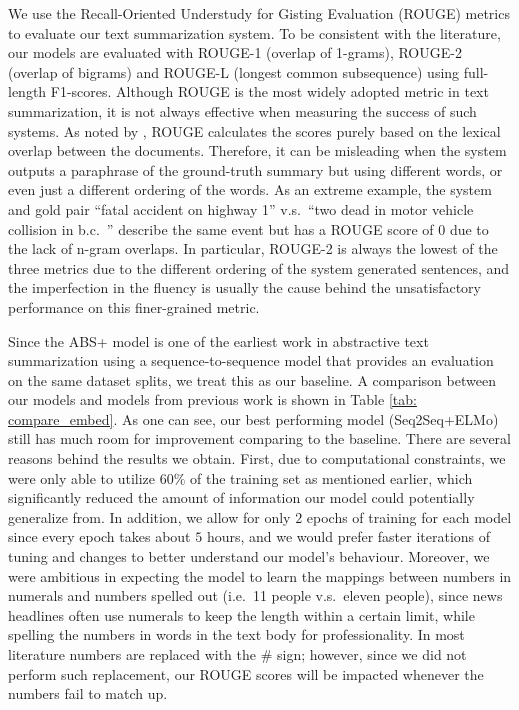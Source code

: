 We use the Recall-Oriented Understudy for Gisting Evaluation (ROUGE) metrics \cite{lin2004rouge} to evaluate our text summarization system. To be consistent with the literature, our models are evaluated with ROUGE-1 (overlap of 1-grams), ROUGE-2 (overlap of bigrams) and ROUGE-L (longest common subsequence) using full-length F1-scores. Although ROUGE is the most widely adopted metric in text summarization, it is not always effective when measuring the success of such systems. As noted by \cite{cohan2016revisiting}, ROUGE calculates the scores purely based on the lexical overlap between the documents. Therefore, it can be misleading when the system outputs a paraphrase of the ground-truth summary but using different words, or even just a different ordering of the words. As an extreme example, the system and gold pair ``fatal accident on highway 1'' v.s.\ ``two dead in motor vehicle collision in b.c.\ '' describe the same event but has a ROUGE score of $0$ due to the lack of n-gram overlaps. In particular, ROUGE-2 is always the lowest of the three metrics due to the different ordering of the system generated sentences, and the imperfection in the fluency is usually the cause behind the unsatisfactory performance on this finer-grained metric.

Since the ABS+ model \cite{rush2015neural} is one of the earliest work in abstractive text summarization using a sequence-to-sequence model that provides an evaluation on the same dataset splits, we treat this as our baseline. A comparison between our models and models from previous work is shown in Table \ref{tab: compare_embed}. As one can see, our best performing model (Seq2Seq+ELMo) still has much room for improvement comparing to the baseline. There are several reasons behind the results we obtain. First, due to computational constraints, we were only able to utilize $60\%$ of the training set as mentioned earlier, which significantly reduced the amount of information our model could potentially generalize from. In addition, we allow for only $2$ epochs of training for each model since every epoch takes about $5$ hours, and we would prefer faster iterations of tuning and changes to better understand our model's behaviour. Moreover, we were ambitious in expecting the model to learn the mappings between numbers in numerals and numbers spelled out (i.e.\ 11 people v.s.\ eleven people), since news headlines often use numerals to keep the length within a certain limit, while spelling the numbers in words in the text body for professionality. In most literature numbers are replaced with the $\#$ sign; however, since we did not perform such replacement, our ROUGE scores will be impacted whenever the numbers fail to match up. 

